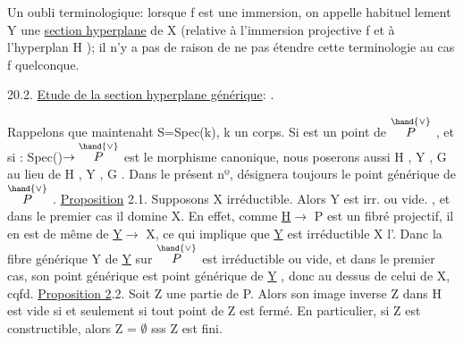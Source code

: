 
Un oubli terminologique: lorsque f est une immersion, on appelle habituel%
lement Y\hand{$_\zeta$} une \uline{section hyperplane} de X (relative à l'immersion projective
f et à l'hyperplan H  ); il n'y a pas de raison de ne pas étendre cette
terminologie au cas f quelconque.

20.2. \uline{Etude de la section hyperplane générique}:  .

Rappelons que maintenaht S=Spec(k), k un corps. Si \hand{$\eta$} est un point
de $\overset{\hand{\vee}}{P}$ ,  et si \hand{$\zeta$}: Spec(\hand{$\eta$})$\to\overset{\hand{\vee}}{P}$ est le morphisme canonique, nous poserons
aussi H\hand{$_\eta$} , Y\hand{$_\eta$} , G\hand{$_\eta$} au lieu de H\hand{$_\zeta$} , Y\hand{$_\zeta$} , G\hand{$_\zeta$} . Dans le présent nº, \hand{$\eta$}
désignera toujours le point générique de $\overset{\hand{\vee}}{P}$ .
\uline{Proposition} 2.1. Supposons X irréductible. Alors Y\hand{$_\eta$} est irr.  ou vide. ,
et dans le premier cas il domine X. 
En effet, comme \uline{H}$\longrightarrow$ P est un fibré projectif, il en est de même de
\uline{Y}$\longrightarrow$ X, ce qui implique que \uline{Y} est irréductible X l'. Danc la fibre
générique Y   de \uline{Y} sur $\overset{\hand{\vee}}{P}$ est irréductible ou vide, et dans le premier cas,
son point générique est point générique de \uline{Y} , donc au dessus de celui de
X, cqfd.
\uline{Proposition 2}.2. Soit Z une partie de P. Alors son image inverse Z\hand{$_\eta$} dans
H\hand{$_\eta$} est vide si et seulement si tout point de Z est fermé. En particulier,
si Z est constructible, alors Z\hand{$_\eta$} = $\emptyset$ sss Z est fini.

